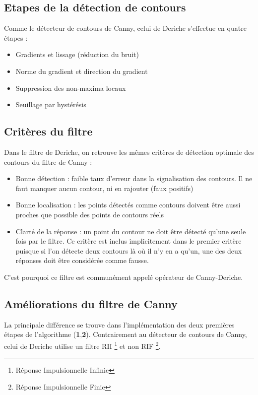 \subsection{Etapes de la détection de contours}

Comme le détecteur de contours de Canny, celui de Deriche s'effectue en quatre étapes :

\begin{itemize}
	\item[\textbf{1}] Gradients et lissage (réduction du bruit)
	\item[\textbf{2}] Norme du gradient et direction du gradient
	\item[\textbf{3}] Suppression des non-maxima locaux
	\item[\textbf{4}] Seuillage par hystérésis
\end{itemize}

\subsection{Critères du filtre}

	Dans le filtre de Deriche, on retrouve les mêmes critères de détection optimale des contours du filtre de Canny : 	
\begin{itemize}
	\item[\textbf{A}] Bonne détection : faible taux d'erreur dans la signalisation des contours. Il ne faut manquer aucun contour, ni en rajouter (faux positifs)
	\item[\textbf{B}] Bonne localisation : les points détectés comme contours doivent être aussi proches que possible des points de contours réels
	\item[\textbf{C}] Clarté de la réponse : un point du contour ne doit être détecté qu'une seule fois par le filtre. Ce critère est inclus implicitement dans le premier critère puisque si l'on détecte deux contours là où il n'y en a qu'un, une des deux réponses doit être considérée comme fausse. \\
\end{itemize}
\noindent
C'est pourquoi ce filtre est communément appelé opérateur de Canny-Deriche.

\subsection{Améliorations du filtre de Canny}

La principale différence se trouve dans l'implémentation des deux premières étapes de l'algorithme (\textbf{1},\textbf{2}). Contrairement au détecteur de contours de Canny, celui de Deriche utilise un filtre RII \footnote{Réponse Impulsionnelle Infinie} et non RIF \footnote{Réponse Impulsionnelle Finie}.

